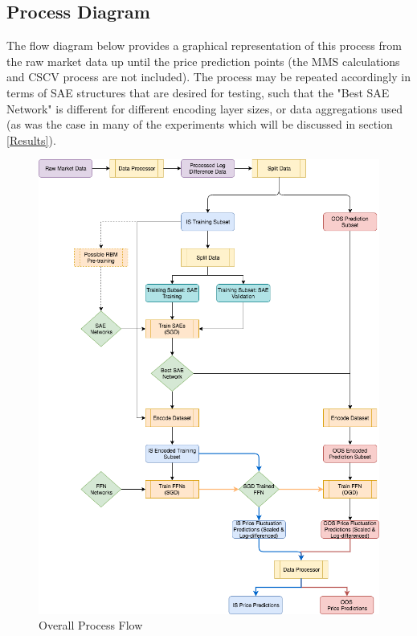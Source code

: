 \documentclass[a4paper,11pt,oneside]{article}
\theoremstyle{plain}
\theoremstyle{definition}
\begin{document}
	\subsection{Process Diagram}\label{proc_diagram}
	
	The flow diagram below provides a graphical representation of this process from the raw market data up until the price prediction points (the MMS calculations and CSCV process are not included). The process may be repeated accordingly in terms of SAE structures that are desired for testing, such that the "Best SAE Network" is different for different encoding layer sizes, or data aggregations used (as was the case in many of the experiments which will be discussed in section \ref{Results}).
	
	\begin{figure}[H]
		\centering \includegraphics[scale=0.6]{images/process_implementation/process_flow.png}
		\caption[Overall Process Flow Diagram]{Overall Process Flow}
		\label{figure-proc_diagram}
	\end{figure}
	
\end{document}
